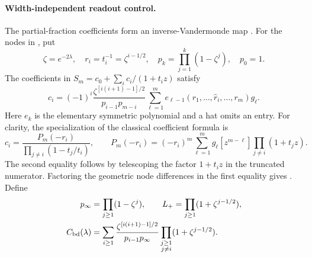 \paragraph{Width-independent readout control.}
The partial-fraction coefficients form an inverse-Vandermonde map
\cite{Gautschi1962}. For the nodes in , put
\begin{equation}
 \zeta=e^{-2\lambda},\quad r_i=t_i^{-1}=\zeta^{i-1/2},\quad
 p_k=\prod_{j=1}^k(1-\zeta^j),\quad p_0=1.
 \label{eq:zeta-p}
\end{equation}
The coefficients in $S_m=c_0+\sum_i c_i/(1+t_i z)$ satisfy
\begin{equation}
 c_i=(-1)^i\frac{\zeta^{[i(i+1)-1]/2}}{p_{i-1}p_{m-i}}
 \sum_{\ell=1}^m e_{\ell-1}(r_1,\ldots,\widehat r_i,\ldots,r_m)g_\ell.
 \label{eq:scaled-pf}
\end{equation}
Here $e_k$ is the elementary symmetric polynomial and a hat omits an entry.
For clarity, the specialization of the classical coefficient formula is
\[
 c_i=\frac{P_m(-r_i)}{\prod_{j\ne i}(1-t_j/t_i)},\qquad
 P_m(-r_i)=(-r_i)^m\sum_{\ell=1}^m g_\ell
 [z^{m-\ell}]\prod_{j\ne i}(1+t_jz).
\]
The second equality follows by telescoping the factor $1+t_i z$ in the
truncated numerator. Factoring the geometric node differences in the
first equality gives .
Define
\begin{align}
 p_\infty&=\prod_{j\ge1}(1-\zeta^j),\qquad
 L_+=\prod_{j\ge1}(1+\zeta^{j-1/2}), \label{eq:pinfty}\\
 C_{\mathrm{bd}}(\lambda)&=\sum_{i\ge1}
 \frac{\zeta^{[i(i+1)-1]/2}}{p_{i-1}p_\infty}
 \prod_{\substack{j\ge1\\j\ne i}}(1+\zeta^{j-1/2}).
 \label{eq:Cbd}
\end{align}

